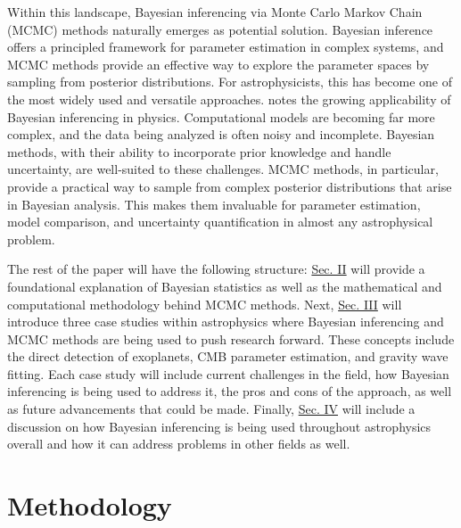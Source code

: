 \documentclass[preprint2,linenumbers,longauthor]{aastex631}
\begin{document}
Within this landscape, Bayesian inferencing via Monte Carlo Markov Chain (MCMC) methods naturally emerges as potential solution. Bayesian inference offers a principled framework for parameter estimation in complex systems, and MCMC methods provide an effective way to explore the parameter spaces by sampling from posterior distributions. For astrophysicists, this has become one of the most widely used and versatile approaches. \citet{vontoussaintBayesianInferencePhysics2011} notes the growing applicability of Bayesian inferencing in physics. Computational models are becoming far more complex, and the data being analyzed is often noisy and incomplete. Bayesian methods, with their ability to incorporate prior knowledge and handle uncertainty, are well-suited to these challenges. MCMC methods, in particular, provide a practical way to sample from complex posterior distributions that arise in Bayesian analysis. This makes them invaluable for parameter estimation, model comparison, and uncertainty quantification in almost any astrophysical problem.

The rest of the paper will have the following structure: \hyperref[sec:Methodology]{Sec. II} will provide a foundational explanation of Bayesian statistics as well as the mathematical and computational methodology behind MCMC methods. Next, \hyperref[placeholder]{Sec. III} will introduce three case studies within astrophysics where Bayesian inferencing and MCMC methods are being used to push research forward. These concepts include the direct detection of exoplanets, CMB parameter estimation, and gravity wave fitting. Each case study will include current challenges in the field, how Bayesian inferencing is being used to address it, the pros and cons of the approach, as well as future advancements that could be made. Finally, \hyperref[placeholder]{Sec. IV} will include a discussion on how Bayesian inferencing is being used throughout astrophysics overall and how it can address problems in other fields as well.

\section{Methodology}
\label{sec:Methodology}



\end{document}
